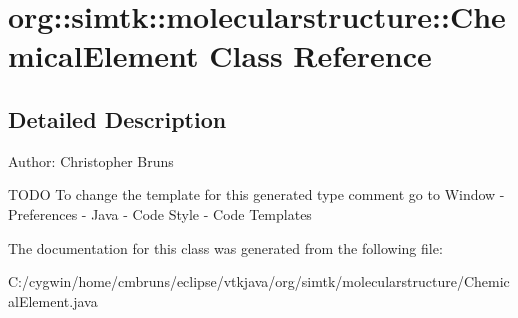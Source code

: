 \section{org::simtk::molecularstructure::Chemical\-Element Class Reference}
\label{classorg_1_1simtk_1_1molecularstructure_1_1_chemical_element}


\subsection{Detailed Description}
\begin{Desc}
\item[Author:]Christopher Bruns\end{Desc}
TODO To change the template for this generated type comment go to Window - Preferences - Java - Code Style - Code Templates 



The documentation for this class was generated from the following file:\begin{CompactItemize}
\item 
C:/cygwin/home/cmbruns/eclipse/vtkjava/org/simtk/molecularstructure/Chemical\-Element.java\end{CompactItemize}
